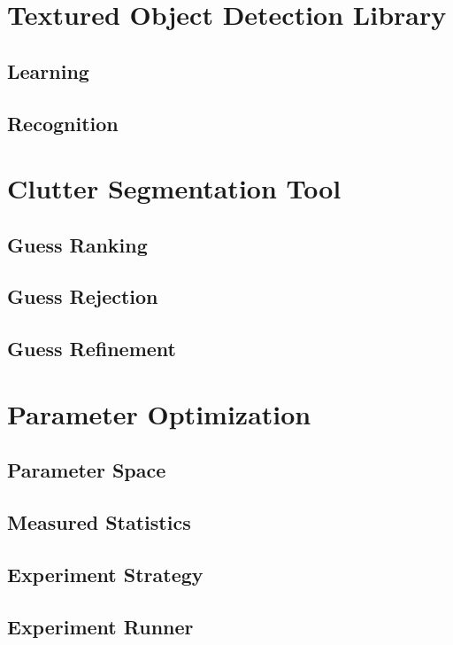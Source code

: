 \section{Textured Object Detection Library}
\subsection{Learning}
\subsection{Recognition}

\section{Clutter Segmentation Tool}
\subsection{Guess Ranking}
\subsection{Guess Rejection}
\subsection{Guess Refinement}

\section{Parameter Optimization}
\subsection{Parameter Space}
\subsection{Measured Statistics}
\subsection{Experiment Strategy}
\subsection{Experiment Runner}

